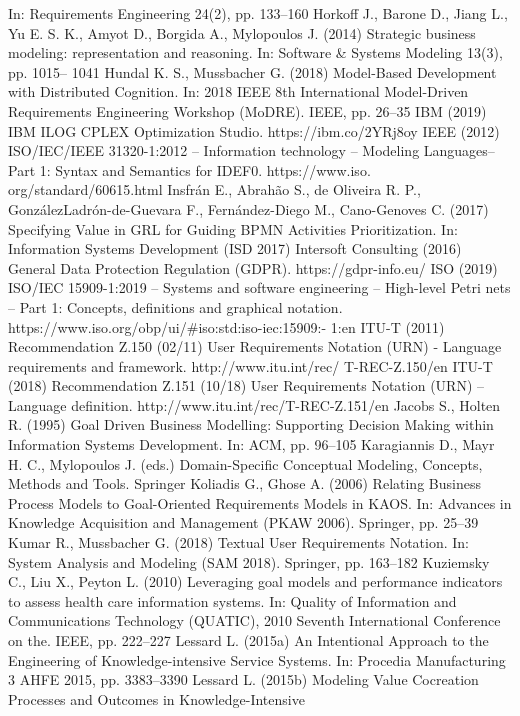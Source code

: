 In: Requirements Engineering 24(2), pp. 133–160
Horkoff J., Barone D., Jiang L., Yu E. S. K., Amyot
D., Borgida A., Mylopoulos J. (2014) Strategic
business modeling: representation and reasoning.
In: Software & Systems Modeling 13(3), pp. 1015–
1041
Hundal K. S., Mussbacher G. (2018) Model-Based
Development with Distributed Cognition. In: 2018
IEEE 8th International Model-Driven Requirements Engineering Workshop (MoDRE). IEEE,
pp. 26–35
IBM (2019) IBM ILOG CPLEX Optimization
Studio. https://ibm.co/2YRj8oy
IEEE (2012) ISO/IEC/IEEE 31320-1:2012 – Information technology – Modeling Languages–Part 1:
Syntax and Semantics for IDEF0. https://www.iso.
org/standard/60615.html
Insfrán E., Abrahão S., de Oliveira R. P., GonzálezLadrón-de-Guevara F., Fernández-Diego M.,
Cano-Genoves C. (2017) Specifying Value in GRL
for Guiding BPMN Activities Prioritization. In:
Information Systems Development (ISD 2017)
Intersoft Consulting (2016) General Data Protection Regulation (GDPR). https://gdpr-info.eu/
ISO (2019) ISO/IEC 15909-1:2019 – Systems and
software engineering – High-level Petri nets – Part
1: Concepts, definitions and graphical notation.
https://www.iso.org/obp/ui/#iso:std:iso-iec:15909:-
1:en
ITU-T (2011) Recommendation Z.150 (02/11)
User Requirements Notation (URN) - Language
requirements and framework. http://www.itu.int/rec/
T-REC-Z.150/en
ITU-T (2018) Recommendation Z.151 (10/18)
User Requirements Notation (URN) – Language
definition. http://www.itu.int/rec/T-REC-Z.151/en
Jacobs S., Holten R. (1995) Goal Driven Business
Modelling: Supporting Decision Making within
Information Systems Development. In: ACM,
pp. 96–105
Karagiannis D., Mayr H. C., Mylopoulos J. (eds.)
Domain-Specific Conceptual Modeling, Concepts,
Methods and Tools. Springer
Koliadis G., Ghose A. (2006) Relating Business Process Models to Goal-Oriented Requirements Models in KAOS. In: Advances in Knowledge Acquisition and Management (PKAW 2006).
Springer, pp. 25–39
Kumar R., Mussbacher G. (2018) Textual User
Requirements Notation. In: System Analysis and
Modeling (SAM 2018). Springer, pp. 163–182
Kuziemsky C., Liu X., Peyton L. (2010) Leveraging goal models and performance indicators to
assess health care information systems. In: Quality
of Information and Communications Technology
(QUATIC), 2010 Seventh International Conference on the. IEEE, pp. 222–227
Lessard L. (2015a) An Intentional Approach to
the Engineering of Knowledge-intensive Service
Systems. In: Procedia Manufacturing 3 AHFE
2015, pp. 3383–3390
Lessard L. (2015b) Modeling Value Cocreation
Processes and Outcomes in Knowledge-Intensive
